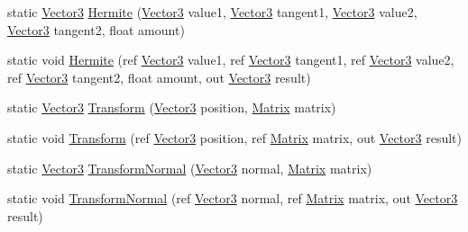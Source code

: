 \begin{DoxyCompactItemize}
\item 
static \hyperlink{struct_microsoft_1_1_xna_1_1_framework_1_1_vector3}{Vector3} \hyperlink{struct_microsoft_1_1_xna_1_1_framework_1_1_vector3_a64a597997b6023569d639155f9abf76e}{Hermite} (\hyperlink{struct_microsoft_1_1_xna_1_1_framework_1_1_vector3}{Vector3} value1, \hyperlink{struct_microsoft_1_1_xna_1_1_framework_1_1_vector3}{Vector3} tangent1, \hyperlink{struct_microsoft_1_1_xna_1_1_framework_1_1_vector3}{Vector3} value2, \hyperlink{struct_microsoft_1_1_xna_1_1_framework_1_1_vector3}{Vector3} tangent2, float amount)
\item 
static void \hyperlink{struct_microsoft_1_1_xna_1_1_framework_1_1_vector3_a820a639c67fecfe9837f7b1087017145}{Hermite} (ref \hyperlink{struct_microsoft_1_1_xna_1_1_framework_1_1_vector3}{Vector3} value1, ref \hyperlink{struct_microsoft_1_1_xna_1_1_framework_1_1_vector3}{Vector3} tangent1, ref \hyperlink{struct_microsoft_1_1_xna_1_1_framework_1_1_vector3}{Vector3} value2, ref \hyperlink{struct_microsoft_1_1_xna_1_1_framework_1_1_vector3}{Vector3} tangent2, float amount, out \hyperlink{struct_microsoft_1_1_xna_1_1_framework_1_1_vector3}{Vector3} result)
\item 
static \hyperlink{struct_microsoft_1_1_xna_1_1_framework_1_1_vector3}{Vector3} \hyperlink{struct_microsoft_1_1_xna_1_1_framework_1_1_vector3_a33de6f1d854d190d79f6b4dd630b3d53}{Transform} (\hyperlink{struct_microsoft_1_1_xna_1_1_framework_1_1_vector3}{Vector3} position, \hyperlink{struct_microsoft_1_1_xna_1_1_framework_1_1_matrix}{Matrix} matrix)
\item 
static void \hyperlink{struct_microsoft_1_1_xna_1_1_framework_1_1_vector3_abb59821417a34849ca7defa5bda1ea1a}{Transform} (ref \hyperlink{struct_microsoft_1_1_xna_1_1_framework_1_1_vector3}{Vector3} position, ref \hyperlink{struct_microsoft_1_1_xna_1_1_framework_1_1_matrix}{Matrix} matrix, out \hyperlink{struct_microsoft_1_1_xna_1_1_framework_1_1_vector3}{Vector3} result)
\item 
static \hyperlink{struct_microsoft_1_1_xna_1_1_framework_1_1_vector3}{Vector3} \hyperlink{struct_microsoft_1_1_xna_1_1_framework_1_1_vector3_a12ba07a55e6d5608c8db613baf9ea7e2}{Transform\+Normal} (\hyperlink{struct_microsoft_1_1_xna_1_1_framework_1_1_vector3}{Vector3} normal, \hyperlink{struct_microsoft_1_1_xna_1_1_framework_1_1_matrix}{Matrix} matrix)
\item 
static void \hyperlink{struct_microsoft_1_1_xna_1_1_framework_1_1_vector3_a678c1e93a9259f241a9790c6a42c7c84}{Transform\+Normal} (ref \hyperlink{struct_microsoft_1_1_xna_1_1_framework_1_1_vector3}{Vector3} normal, ref \hyperlink{struct_microsoft_1_1_xna_1_1_framework_1_1_matrix}{Matrix} matrix, out \hyperlink{struct_microsoft_1_1_xna_1_1_framework_1_1_vector3}{Vector3} result)

\end{DoxyCompactItemize}
